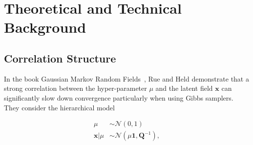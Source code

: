 \chapter{Theoretical and Technical Background}

\section{Correlation Structure}
\label{ap:Correlation}
In the book Gaussian Markov Random Fields~\cite{rue2005gaussian}, Rue and Held demonstrate that a strong correlation between the hyper-parameter $\mu$ and the latent field $\bm{x}$ can significantly slow down convergence particularly when using Gibbs samplers.  
They consider the hierarchical model

\begin{subequations}
	\begin{align}
		\mu &\sim \mathcal{N}(0, 1) \\
		\bm{x} | \mu &\sim \mathcal{N}(\mu \bm{1}, \bm{Q}^{-1}),
	\end{align}
	\label{eq:rueMod}
\end{subequations}

